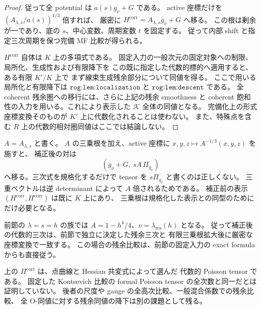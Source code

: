 \begin{proof}
従って全 potential は $a(s)g_\nu+G$ である。
active 座標だけを $(A_{\lambda,s}/a(s))^{1/3}$ 倍すれば、
厳密に $H^{\mathrm{corr}}=A_{\lambda,s}g_\nu+G$ へ移る。
この根は剰余が一であり、底の $s$、中心変数、周期変数 $t$ を固定する。
従って内部 shift と指定三次周期を保つ完備 MF 比較が得られる。

$H^{\mathrm{corr}}$ 自体は $K$ 上の多項式である。
固定入力の一般次元の固定対象への制限、局所化、生成性および有限降下を
この既に指定した代数的標的へ適用すると、ある有限 $K'/K$ 上で
まず線束生成残余部分について同値を得る。
ここで用いる局所化と有限降下は $\texttt{rog:lem:localization}$ と
$\texttt{rog:lem:descent}$ である。
全 coherent 残余圏への移行には、さらに上記の残余 smoothness と
coherent 飽和性の入力を用いる。これにより表示した $\mathcal K$ 全体の同値となる。
完備化上の形式座標変換そのものが $K'$ 上に代数化されることは使わない。
また、特殊点を含む $R$ 上の代数的相対圏同値はここでは結論しない。
\end{proof}

\begin{remark}[尺度と既存の一パラメータ例]
$A=A_{\lambda,s}$ と書く。
$A$ の三乗根を加え、active 座標に $x,y,z\mapsto A^{-1/3}(x,y,z)$ を施すと、
補正後の対は
\[
 \left(g_\nu+G,\ sA\,\Pi_{g_\nu}\right)
\]
へ移る。三次式を規格化するだけで tensor を $s\Pi_{g_\nu}$ と書くのは正しくない。
三重ベクトルは逆 determinant によって $A$ 倍されるためである。
補正前の表示 $(H^{\mathrm{corr}},\Pi^{\mathrm{corr}})$ は既に $K$ 上にあり、
三乗根は規格化した表示との同型のためにだけ必要となる。

前節の $\lambda=s=h$ の族では
$A=1-h^4/4$、$\nu=\lambda_{\mathrm{res}}(h)$ となる。
従って補正後の代数的三次は、前節で独立に決定した残余三次と
有限三乗根拡大後に厳密な座標変換で一致する。
この場合の残余比較は、前節の固定入力の exact formula からも直接従う。

上の $\Pi^{\mathrm{corr}}$ は、点曲線と Hessian 共変式によって選んだ
代数的 Poisson tensor である。
固定した Kontsevich 比較の formal Poisson tensor の全次数と同一だとは証明していない。
後者の尺度や gauge の全高次比較、一般混合係数での残余比較、
全 O-同値に対する残余同値の降下は別の課題として残る。
\end{remark}
